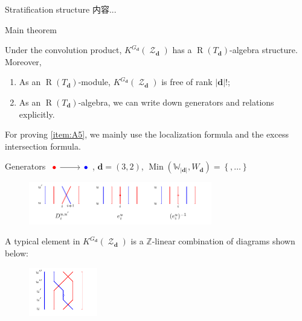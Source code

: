 \documentclass{beamer}
\numberwithin{equation}{section}
\theoremstyle{plain}
\numberwithin{equation}{section}
\theoremstyle{remark}
\DeclareMathOperator{\Rpt}{\operatorname{R}}
\DeclareMathOperator{\St}{\mathcal{Z}}
\newcommand{\dimvec}[1]{\mathbf{#1}}
\newcommand{\abdimvec}[1]{|\dimvec{#1}|}
\newcommand{\absgp}[1]{\mathbb{#1}}
\newcommand{\MinWd}{\operatorname{Min}(\absgp{W}_{\abdimvec{d}},W_{\dimvec{d}})}
\begin{document}
\begin{frame}[fragile]{Stratification structure}
内容...
\end{frame}

\begin{frame}[fragile]{Main theorem}
\begin{theorem}
Under the convolution product, $K^{G_{\dimvec{d}}}(\St_{\dimvec{d}})$ has a $\Rpt(T_{\dimvec{d}})$-algebra structure. Moreover,
\begingroup
\upshape
\newcommand\labelenumi{(\theenumi)}
\begin{enumerate}
\item As an $\Rpt(T_{\dimvec{d}})$-module, $K^{G_{\dimvec{d}}}(\St_{\dimvec{d}})$ is free of rank $\abdimvec{d}!$;\label{item:A1}
\item As an $\Rpt(T_{\dimvec{d}})$-algebra, we can write down generators and relations explicitly.\label{item:A5}
\end{enumerate}
\endgroup 
\end{theorem}
For proving \eqref{item:A5}, we mainly use the localization formula and the excess intersection formula.
\end{frame}

\begin{frame}[fragile]{Generators}
$\begin{tikzcd}[ampersand replacement=\&]
	\textcolor{red}{\bullet} \& \textcolor{blue}{\bullet} 
	\arrow[from=1-1, to=1-2]
 \end{tikzcd}$, 
$\dimvec{d}=(3,2)$, 
$\MinWd =\left\{ ,\ldots \right\}$
\begin{figure}[ht]
  \vspace{0cm}
    \centering  \includegraphics[width=8cm]{strands/generators.pdf}
      \label{fig:generators}        
\end{figure}
A typical element in $K^{G_{\dimvec{d}}}(\St_{\dimvec{d}})$ is a $\mathbb{Z}$-linear combination of diagrams shown below:
\begin{figure}[ht]
  \vspace{0cm}
    \centering  \includegraphics[width=3cm]{strands/glue_vertically_part.pdf}
      \label{fig:glue_vertically_part}        
\end{figure}
\end{frame}
\end{document}
